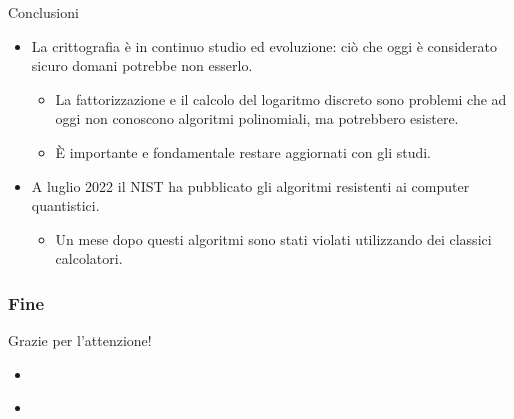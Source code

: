 \documentclass[11pt,svgnames,smaller,aspectratio=169,italian]{beamer}
\begin{document}
\begin{frame}{Conclusioni}
	\begin{itemize}
		\item La crittografia è in continuo studio ed evoluzione: ciò che oggi è considerato sicuro domani potrebbe non esserlo.
			\begin{itemize}
				\item La fattorizzazione e il calcolo del logaritmo discreto sono problemi che ad oggi non conoscono algoritmi polinomiali, ma potrebbero esistere.
				\item È importante e fondamentale restare aggiornati con gli studi.
			\end{itemize}
		\item A luglio 2022 il NIST ha pubblicato gli algoritmi resistenti ai computer quantistici.
			\begin{itemize}
				\item Un mese dopo questi algoritmi sono stati violati utilizzando dei classici calcolatori.
			\end{itemize}
	\end{itemize}
\end{frame}

\begin{frame}
		\frametitle{Fine}
		\centering
		\Large
		Grazie per l'attenzione!
 	\end{frame}

\begin{frame}{}
	\begin{itemize}
		\item 
	\end{itemize}
\end{frame}

\begin{frame}{}
	\begin{itemize}
		\item 
	\end{itemize}
\end{frame}













\end{document}
